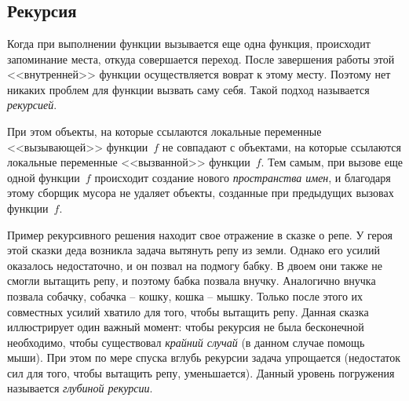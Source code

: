 \chapter{}
\section*{Рекурсия}

Когда при выполнении функции вызывается еще одна функция, происходит запоминание места, откуда совершается переход. После завершения работы этой <<внутренней>>  функции осуществляется воврат к этому месту. Поэтому нет никаких проблем для функции вызвать саму себя. Такой подход называется \emph{рекурсией}.

При этом объекты, на которые ссылаются локальные переменные <<вызывающей>> функции~$f$ не совпадают с объектами, на которые ссылаются локальные переменные <<вызванной>> функции~$f$. Тем самым, при вызове еще одной функции~$f$ происходит создание нового \emph{пространства имен}, и благодаря этому сборщик мусора не удаляет объекты, созданные при предыдущих вызовах функции~$f$.

Пример рекурсивного решения находит свое отражение в сказке о репе. У героя этой сказки деда возникла задача вытянуть репу из земли. Однако его усилий оказалось недостаточно, и он позвал на подмогу бабку. В двоем они также не смогли вытащить репу, и поэтому бабка позвала внучку. Аналогично внучка позвала собачку, собачка -- кошку, кошка -- мышку. Только после этого их совместных усилий хватило для того, чтобы вытащить репу. Данная сказка иллюстрирует один важный момент: чтобы рекурсия не была бесконечной необходимо, чтобы существовал \emph{крайний случай} (в данном случае помощь мыши). При этом по мере спуска вглубь рекурсии задача упрощается (недостаток сил для того, чтобы вытащить репу, уменьшается). 
Данный уровень погружения называется \emph{глубиной рекурсии}.  

